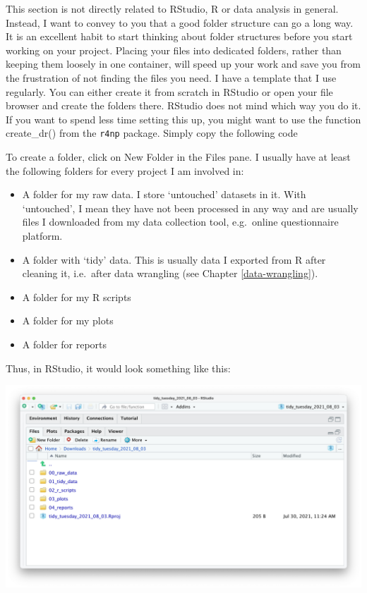 \documentclass[
]{book}
\begin{document}
This section is not directly related to RStudio, R or data analysis in general. Instead, I want to convey to you that a good folder structure can go a long way. It is an excellent habit to start thinking about folder structures before you start working on your project. Placing your files into dedicated folders, rather than keeping them loosely in one container, will speed up your work and save you from the frustration of not finding the files you need. I have a template that I use regularly. You can either create it from scratch in RStudio or open your file browser and create the folders there. RStudio does not mind which way you do it. If you want to spend less time setting this up, you might want to use the function create\_dr() from the \texttt{r4np} package. Simply copy the following code

To create a folder, click on New Folder in the Files pane. I usually have at least the following folders for every project I am involved in:

\begin{itemize}
\item
  A folder for my raw data. I store `untouched' datasets in it. With `untouched', I mean they have not been processed in any way and are usually files I downloaded from my data collection tool, e.g.~online questionnaire platform.
\item
  A folder with `tidy' data. This is usually data I exported from R after cleaning it, i.e.~after data wrangling (see Chapter \ref{data-wrangling}).
\item
  A folder for my R scripts
\item
  A folder for my plots
\item
  A folder for reports
\end{itemize}

Thus, in RStudio, it would look something like this:

\includegraphics{images/chapter_06_img/01_organising_work/00_organising_work.png}
\end{document}
